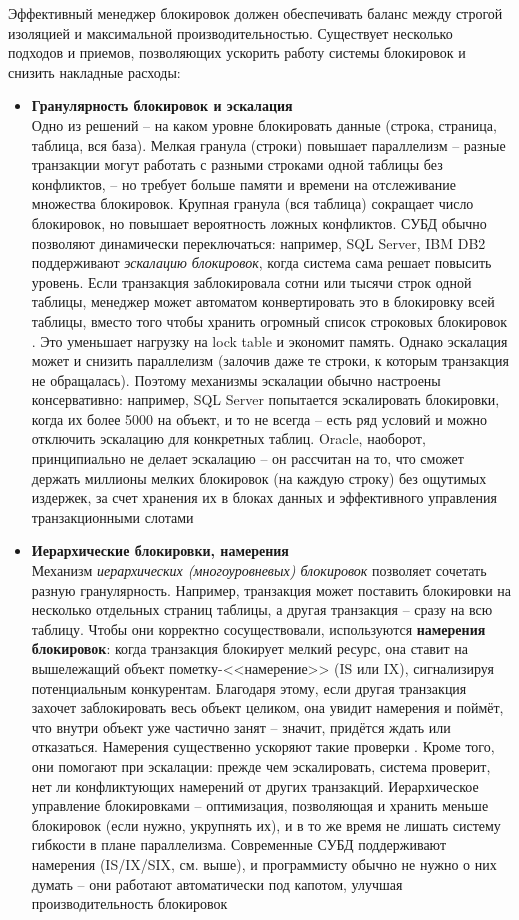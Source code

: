  Эффективный менеджер блокировок должен обеспечивать баланс между строгой изоляцией и максимальной производительностью. Существует несколько подходов и приемов, позволяющих ускорить работу системы блокировок и снизить накладные расходы: 
 \begin{itemize}
    \item \textbf{Гранулярность блокировок и эскалация} ~\\
    Одно из решений – на каком уровне блокировать данные (строка, страница, таблица, вся база). Мелкая гранула (строки) повышает параллелизм – разные транзакции могут работать с разными строками одной таблицы без конфликтов, – но требует больше памяти и времени на отслеживание множества блокировок. Крупная гранула (вся таблица) сокращает число блокировок, но повышает вероятность ложных конфликтов. СУБД обычно позволяют динамически переключаться: например, SQL Server, IBM DB2 поддерживают \textit{эскалацию блокировок}, когда система сама решает повысить уровень. Если транзакция заблокировала сотни или тысячи строк одной таблицы, менеджер может автоматом конвертировать это в блокировку всей таблицы, вместо того чтобы хранить огромный список строковых блокировок \autocite{oracleessentialsc7}. Это уменьшает нагрузку на lock table и экономит память. Однако эскалация может и снизить параллелизм (залочив даже те строки, к которым транзакция не обращалась). Поэтому механизмы эскалации обычно настроены консервативно: например, SQL Server попытается эскалировать блокировки, когда их более 5000 на объект, и то не всегда – есть ряд условий и можно отключить эскалацию для конкретных таблиц. Oracle, наоборот, принципиально не делает эскалацию – он рассчитан на то, что сможет держать миллионы мелких блокировок (на каждую строку) без ощутимых издержек, за счет хранения их в блоках данных и эффективного управления транзакционными слотами \autocite{oracleessentialsc7} 
    \item \textbf{Иерархические блокировки, намерения} ~\\
    Механизм \textit{иерархических (многоуровневых) блокировок} позволяет сочетать разную гранулярность. Например, транзакция может поставить блокировки на несколько отдельных страниц таблицы, а другая транзакция – сразу на всю таблицу. Чтобы они корректно сосуществовали, используются \textbf{намерения блокировок}: когда транзакция блокирует мелкий ресурс, она ставит на вышележащий объект пометку-<<намерение>> (IS или IX), сигнализируя потенциальным конкурентам. Благодаря этому, если другая транзакция захочет заблокировать весь объект целиком, она увидит намерения и поймёт, что внутри объект уже частично занят – значит, придётся ждать или отказаться. Намерения существенно ускоряют такие проверки \autocite{sqlhack1}. Кроме того, они помогают при эскалации: прежде чем эскалировать, система проверит, нет ли конфликтующих намерений от других транзакций. Иерархическое управление блокировками – оптимизация, позволяющая и хранить меньше блокировок (если нужно, укрупнять их), и в то же время не лишать систему гибкости в плане параллелизма. Современные СУБД поддерживают намерения (IS/IX/SIX, см. выше), и программисту обычно не нужно о них думать – они работают автоматически под капотом, улучшая производительность блокировок

\end{itemize}
